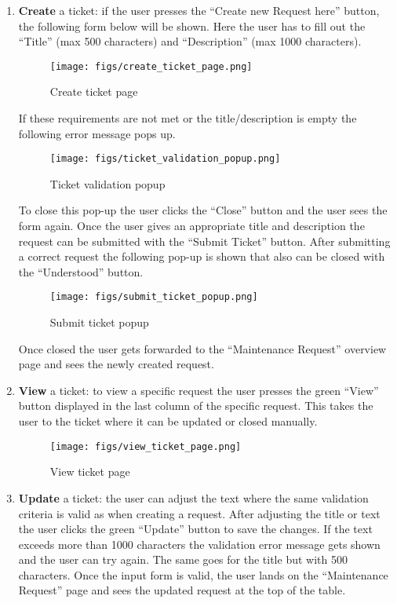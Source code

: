 \documentclass[conference]{IEEEtran}
\begin{document}
\begin{enumerate}
    \item \textbf{Create} a ticket: if the user presses the “Create new Request here” button, the following form below will be shown. Here the user has to fill out the “Title” (max 500 characters) and “Description” (max 1000 characters).
    \begin{figure}[H]
    \centering
    \texttt{[image: figs/create\_ticket\_page.png]}
    \caption{Create ticket page}
    \label{fig:Create ticket page}
    \end{figure}
    If these requirements are not met or the title/description is empty the following error message pops up.
    \begin{figure}[H]
    \centering
    \texttt{[image: figs/ticket\_validation\_popup.png]}
    \caption{Ticket validation popup}
    \label{fig:Ticket validation popup}
    \end{figure}
    To close this pop-up the user clicks the “Close” button and the user sees the form again. Once the user gives an appropriate title and description the request can be submitted with the “Submit Ticket” button. After submitting a correct request the following pop-up is shown that also can be closed with the “Understood” button.
    \begin{figure}[H]
    \centering
    \texttt{[image: figs/submit\_ticket\_popup.png]}
    \caption{Submit ticket popup}
    \label{fig:Submit ticket popup}
    \end{figure}
    Once closed the user gets forwarded to the “Maintenance Request” overview page and sees the newly created request.
    \item \textbf{View} a ticket: to view a specific request the user presses the green “View” button displayed in the last column of the specific request. This takes the user to the ticket where it can be updated or closed manually.
    \begin{figure}[H]
    \centering
    \texttt{[image: figs/view\_ticket\_page.png]}
    \caption{View ticket page}
    \label{fig:View ticket page}
    \end{figure}
    \item \textbf{Update} a ticket: the user can adjust the text where the same validation criteria is valid as when creating a request. After adjusting the title or text the user clicks the green “Update” button to save the changes. If the text exceeds more than 1000 characters the validation error message gets shown and the user can try again. The same goes for the title but with 500 characters. Once the input form is valid, the user lands on the “Maintenance Request” page and sees the updated request at the top of the table.

\end{enumerate}
\end{document}

